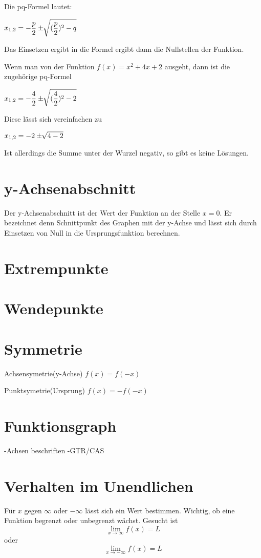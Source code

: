 \documentclass[10pt,a4paper]{article}
\begin{document}
Die pq-Formel lautet: \newline

$\mathlarger{x_{1,2} = -\frac{p}{2} \pm \sqrt[]{(\frac{p}{2})^2 - q}}$ \newline

Das Einsetzen ergibt in die Formel ergibt dann die Nullstellen der Funktion.

Wenn man von der Funktion $f(x) = x^2 + 4x + 2$ ausgeht, dann ist die zugehörige pq-Formel \newline

$\mathlarger{x_{1,2} = -\frac{4}{2} \pm \sqrt[]{(\frac{4}{2})^2 - 2}}$ \newline

Diese lässt sich vereinfachen zu \newline

$\mathlarger{x_{1,2} = -2 \pm \sqrt[]{4 - 2}}$

Ist allerdings die Summe unter der Wurzel negativ, so gibt es keine Lösungen.

\section*{y-Achsenabschnitt}

Der y-Achsenabschnitt ist der Wert der Funktion an der Stelle $x = 0$.
Er bezeichnet denn Schnittpunkt des Graphen mit der y-Achse und lässt sich
durch Einsetzen von Null in die Ursprungsfunktion berechnen. 

\section*{Extrempunkte}

\section*{Wendepunkte}

\section*{Symmetrie}
Achsensymetrie(y-Achse) $f(x) = f(-x)$

Punktsymetrie(Ursprung) $f(x) = -f(-x)$
\section*{Funktionsgraph}
-Achsen beschriften
-GTR/CAS

\section*{Verhalten im Unendlichen}
Für $x$ gegen $\infty$ oder $-\infty$ lässt sich ein Wert bestimmen.
Wichtig, ob eine Funktion begrenzt oder unbegrenzt wächst.
Gesucht ist \[\lim _{x \to \infty} f(x) = L\] oder \[\lim _{x \to -\infty} f(x) = L\]
\end{document}
